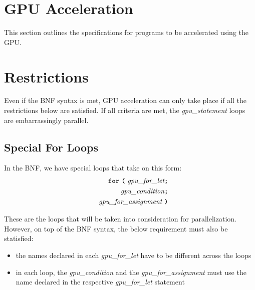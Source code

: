 















\newpage

\section*{GPU Acceleration}
\label{gpu_supp}
This section outlines the specifications for programs to be accelerated using the GPU.\


\newpage

\section*{Restrictions}

Even if the BNF syntax is met, GPU acceleration can only take place if all the restrictions below are satisfied. If all criteria are met, the \textit{gpu\_statement} loops are embarrassingly parallel.

\subsection*{Special For Loops}

In the BNF, we have special loops that take on this form:
\begin{alignat*}{9}
&& \textbf{\texttt{for}}\ \textbf{\texttt{(}} 
                          \ \textit{gpu\_for\_let} \textbf{\texttt{;}} \\
&& \ \ \textit{gpu\_condition} \textbf{\texttt{;}} \\
&& \textit{gpu\_for\_assignment} \ \textbf{\texttt{)}} 
\end{alignat*}

These are the loops that will be taken into consideration for parallelization. However, on top of the BNF syntax, the below requirement must also be statisfied:

\begin{itemize}
    \item{the names declared in each \textit{gpu\_for\_let} have to be different across the loops}
    \item{in each loop, the \textit{gpu\_condition} and the \textit{gpu\_for\_assignment} must use the name declared
    in the respective \textit{gpu\_for\_let} statement}
\end{itemize}

